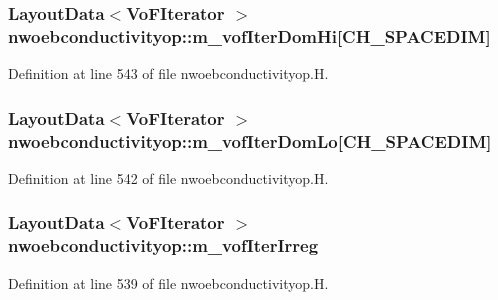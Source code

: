 \subsubsection[{\texorpdfstring{m\+\_\+vof\+Iter\+Dom\+Hi}{m_vofIterDomHi}}]{\setlength{\rightskip}{0pt plus 5cm}Layout\+Data$<$Vo\+F\+Iterator $>$ nwoebconductivityop\+::m\+\_\+vof\+Iter\+Dom\+Hi\mbox{[}C\+H\+\_\+\+S\+P\+A\+C\+E\+D\+IM\mbox{]}\hspace{0.3cm}{\ttfamily [protected]}}\hypertarget{classnwoebconductivityop_a7f90fa9a10ffcdf8eb8fa5efba114788}{}\label{classnwoebconductivityop_a7f90fa9a10ffcdf8eb8fa5efba114788}


Definition at line 543 of file nwoebconductivityop.\+H.

\subsubsection[{\texorpdfstring{m\+\_\+vof\+Iter\+Dom\+Lo}{m_vofIterDomLo}}]{\setlength{\rightskip}{0pt plus 5cm}Layout\+Data$<$Vo\+F\+Iterator $>$ nwoebconductivityop\+::m\+\_\+vof\+Iter\+Dom\+Lo\mbox{[}C\+H\+\_\+\+S\+P\+A\+C\+E\+D\+IM\mbox{]}\hspace{0.3cm}{\ttfamily [protected]}}\hypertarget{classnwoebconductivityop_a2fa55308faa74943daf40669588fecb7}{}\label{classnwoebconductivityop_a2fa55308faa74943daf40669588fecb7}


Definition at line 542 of file nwoebconductivityop.\+H.

\subsubsection[{\texorpdfstring{m\+\_\+vof\+Iter\+Irreg}{m_vofIterIrreg}}]{\setlength{\rightskip}{0pt plus 5cm}Layout\+Data$<$Vo\+F\+Iterator $>$ nwoebconductivityop\+::m\+\_\+vof\+Iter\+Irreg\hspace{0.3cm}{\ttfamily [protected]}}\hypertarget{classnwoebconductivityop_a5ad7de62d10b9222ad8374234d0310ef}{}\label{classnwoebconductivityop_a5ad7de62d10b9222ad8374234d0310ef}


Definition at line 539 of file nwoebconductivityop.\+H.

